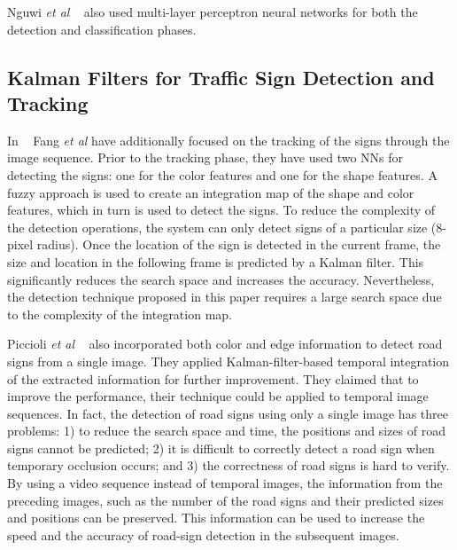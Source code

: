 \documentclass[review,number]{elsarticle}
\begin{document}
Nguwi \textit{et al} ~\cite{nguwi08} also used multi-layer perceptron neural networks for both the detection and classification phases.

\subsection{Kalman Filters for Traffic Sign Detection and Tracking}
In ~\cite{Fang03} Fang \textit{et al} have additionally focused on the tracking of the signs through the image sequence. Prior to the tracking phase, they have used two NNs for detecting the signs: one for the color features and one for the shape features. A fuzzy approach is used to create an integration map of the shape and color features, which in turn is used to detect the signs. To reduce the complexity of the detection operations, the system can only detect signs of a particular size (8-pixel radius). Once the location of the sign is detected in the current frame, the size and location in the following frame is predicted by a Kalman filter. This significantly reduces the search space and increases the accuracy. Nevertheless, the detection technique proposed in this paper requires a large search space due to the complexity of the integration map.

Piccioli \textit{et al} ~\cite{signbib17} also incorporated both color and edge information to detect road signs from a single image. They applied Kalman-filter-based temporal integration of the extracted information for further improvement. They claimed that to improve the performance, their technique could be applied to temporal image sequences. In fact, the detection of road signs using only a single image has three problems: 1) to reduce the search space and time, the positions and sizes of road signs cannot be predicted; 2) it is difficult to correctly detect a road sign when temporary occlusion occurs; and 3) the correctness of road signs is hard to verify. By using a video sequence instead of temporal images, the information from the preceding images, such as the number of the road signs and their predicted sizes and positions can be preserved. This information can be used to increase the speed and the accuracy of road-sign detection in the subsequent images.
\end{document}
